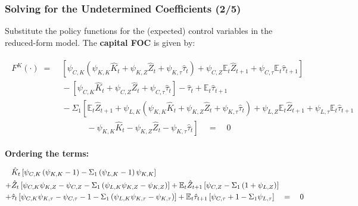 \documentclass[10pt,c,aspectratio=1610,handout]{beamer}
\begin{document}
\begin{frame}%
  \frametitle{Solving for the Undetermined Coefficients (2/5)}%
  Substitute the policy functions for the (expected) control variables in the reduced-form model. The \textbf{capital FOC} is given by:%
  \begin{footnotesize}%
    \begin{align*}%
      \begin{split}%
        F^K(\cdot) \; = & \; \left[ \psi_{C,K} \left( \psi_{K,K} \hat{K}_t + \psi_{K,Z} \hat{Z}_{t} + \psi_{K,\tau} \hat{\tau}_{t} \right) + \psi_{C,Z} \mathbb{E}_t \hat{Z}_{t+1} + \psi_{C,\tau} \mathbb{E}_t \hat{\tau}_{t+1} \right]\\%
        & \; - \left[ \psi_{C,K} \hat{K}_t + \psi_{C,Z} \hat{Z}_{t} + \psi_{C,\tau} \hat{\tau}_{t} \right] - \hat{\tau}_t + \mathbb{E}_t \hat{\tau}_{t+1}\\%
        & \; - \Sigma_1 \left[ \mathbb{E}_t \hat{Z}_{t+1} + \psi_{L,K} \left( \psi_{K,K} \hat{K}_t + \psi_{K,Z} \hat{Z}_{t} + \psi_{K,\tau} \hat{\tau}_{t} \right) + \psi_{L,Z} \mathbb{E}_t \hat{Z}_{t+1} + \psi_{L,\tau} \mathbb{E}_t \hat{\tau}_{t+1} \right.\\%
        & \; \left. \quad \quad \quad - \psi_{K,K} \hat{K}_t - \psi_{K,Z} \hat{Z}_{t} - \psi_{K,\tau} \hat{\tau}_{t} \right] \quad = \quad 0%
      \end{split}%
    \end{align*}%
  \end{footnotesize}%
  \pause%
  \textbf{Ordering the terms:}%
  \begin{footnotesize}%
  \begin{align}%
    \begin{split}%
      & \hat{K}_t \left[ \psi_{C,K} \left( \psi_{K,K} - 1 \right) - \Sigma_1 \left( \psi_{L,K} - 1 \right) \psi_{K,K} \right]\\%
      + & \hat{Z}_{t} \left[ \psi_{C,K} \psi_{K,Z} - \psi_{C,Z} - \Sigma_1 \left(\psi_{L,K} \psi_{K,Z} - \psi_{K,Z} \right) \right] + \mathbb{E}_t \hat{Z}_{t+1} \left[\psi_{C,Z} - \Sigma_1 \left(1+\psi_{L,Z}\right) \right]\\%
      + & \hat{\tau}_{t} \left[ \psi_{C,K} \psi_{K,\tau} - \psi_{C,\tau} - 1 - \Sigma_1 \left( \psi_{L,K} \psi_{K,\tau} - \psi_{K,\tau} \right) \right] + \mathbb{E}_t \hat{\tau}_{t+1} \left[ \psi_{C,\tau} + 1 - \Sigma_1 \psi_{L,\tau} \right] \quad = \quad 0%
    \end{split}\\%
    \notag\\%

\end{align}
\end{footnotesize}
\end{frame}
\end{document}
